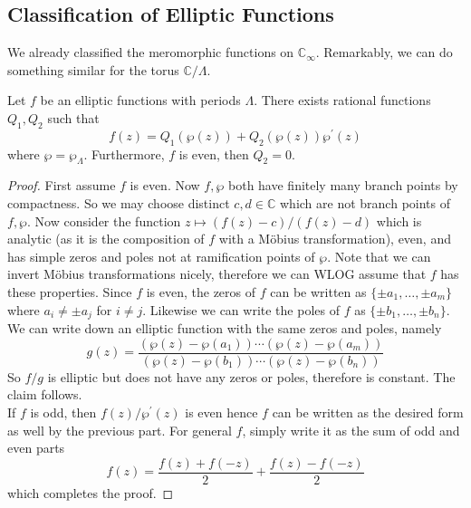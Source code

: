 \subsection{Classification of Elliptic Functions}
We already classified the meromorphic functions on $\mathbb C_\infty$.
Remarkably, we can do something similar for the torus $\mathbb C/\Lambda$.
\begin{theorem}
    Let $f$ be an elliptic functions with periods $\Lambda$.
    There exists rational functions $Q_1,Q_2$ such that
    $$f(z)=Q_1(\wp(z))+Q_2(\wp(z))\wp^\prime(z)$$
    where $\wp=\wp_\Lambda$.
    Furthermore, $f$ is even, then $Q_2=0$.
\end{theorem}
\begin{proof}
    First assume $f$ is even.
    Now $f,\wp$ both have finitely many branch points by compactness.
    So we may choose distinct $c,d\in\mathbb C$ which are not branch points of $f,\wp$.
    Now consider the function $z\mapsto (f(z)-c)/(f(z)-d)$ which is analytic (as it is the composition of $f$ with a M\"obius transformation), even, and has simple zeros and poles not at ramification points of $\wp$.
    Note that we can invert M\"obius transformations nicely, therefore we can WLOG assume that $f$ has these properties.
    Since $f$ is even, the zeros of $f$ can be written as $\{\pm a_1,\ldots,\pm a_m\}$ where $a_i\neq\pm a_j$ for $i\neq j$.
    Likewise we can write the poles of $f$ as $\{\pm b_1,\ldots,\pm b_n\}$.
    We can write down an elliptic function with the same zeros and poles, namely
    $$g(z)=\frac{(\wp(z)-\wp(a_1))\cdots (\wp(z)-\wp(a_m))}{(\wp(z)-\wp(b_1))\cdots (\wp(z)-\wp(b_n))}$$
    So $f/g$ is elliptic but does not have any zeros or poles, therefore is constant.
    The claim follows.\\
    If $f$ is odd, then $f(z)/\wp^\prime(z)$ is even hence $f$ can be written as the desired form as well by the previous part.
    For general $f$, simply write it as the sum of odd and even parts
    $$f(z)=\frac{f(z)+f(-z)}{2}+\frac{f(z)-f(-z)}{2}$$
    which completes the proof.
\end{proof}